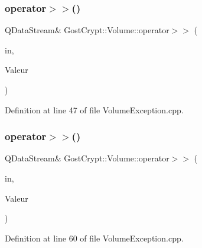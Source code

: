 \subsubsection{\texorpdfstring{operator$>$$>$()}{operator>>()}\hspace{0.1cm}{\footnotesize\ttfamily [3/19]}}
{\footnotesize\ttfamily Q\+Data\+Stream\& Gost\+Crypt\+::\+Volume\+::operator$>$$>$ (\begin{DoxyParamCaption}\item[{Q\+Data\+Stream \&}]{in,  }\item[{\hyperlink{class_gost_crypt_1_1_volume_1_1_encryption_test_failed}{Gost\+Crypt\+::\+Volume\+::\+Encryption\+Test\+Failed} \&}]{Valeur }\end{DoxyParamCaption})}



Definition at line 47 of file Volume\+Exception.\+cpp.

\mbox{\label{namespace_gost_crypt_1_1_volume_abb0556434098d54619fcc0d100d7bc56}} 
\subsubsection{\texorpdfstring{operator$>$$>$()}{operator>>()}\hspace{0.1cm}{\footnotesize\ttfamily [4/19]}}
{\footnotesize\ttfamily Q\+Data\+Stream\& Gost\+Crypt\+::\+Volume\+::operator$>$$>$ (\begin{DoxyParamCaption}\item[{Q\+Data\+Stream \&}]{in,  }\item[{\hyperlink{class_gost_crypt_1_1_volume_1_1_encryption_mode_not_initialized}{Gost\+Crypt\+::\+Volume\+::\+Encryption\+Mode\+Not\+Initialized} \&}]{Valeur }\end{DoxyParamCaption})}



Definition at line 60 of file Volume\+Exception.\+cpp.

\mbox{\label{namespace_gost_crypt_1_1_volume_ac440600274d548b6842e025f2490390d}} 
